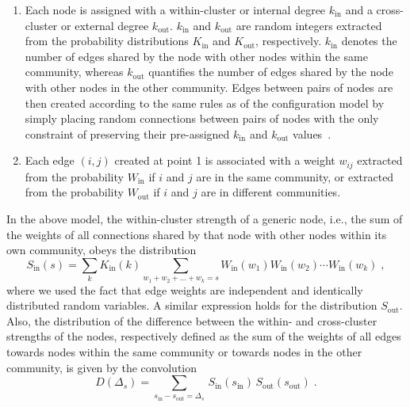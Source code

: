 \documentclass[a4paper,pre,superscriptaddress,floatfix,nofootinbib,twocolumn]{revtex4-1}
\begin{document}
\begin{enumerate}
    \item Each node is assigned with a within-cluster or internal degree $k_\text{in}$  and a cross-cluster or external degree $k_\text{out}$. $k_\text{in}$ and $k_\text{out}$ are random integers extracted from the probability distributions
    $K_\text{in}$ and $K_\text{out}$, respectively.
    $k_\text{in}$ denotes the number of edges shared by the node with other nodes within the same community, whereas $k_\text{out}$ quantifies the number of edges shared by the node with other nodes in the other community.
    Edges between pairs of nodes are then created according to the same rules as of the configuration model by simply placing random connections between pairs of nodes with the only constraint of preserving their pre-assigned $k_\text{in}$ and $k_\text{out}$ values~\cite{molloy1995critical}.

    \item Each edge $(i,j)$ created at point 1 is associated with a weight $w_{ij}$ extracted from the probability $W_\text{in}$ if $i$ and $j$ are in the same community, or extracted from the probability $W_\text{out}$ if $i$ and $j$ are in different communities.
\end{enumerate}

In the above model, the within-cluster strength of a generic node, i.e., the sum of the weights of all connections shared by that node with other nodes within its own community, obeys the distribution
\begin{equation}
    S_\text{in} (s) =
    \sum_{k}  K_\text{in}(k)  \sum_{w_1 + w_2 + \ldots + w_k = s}  W_\text{in}(w_1)  W_\text{in}(w_2) \cdots W_\text{in}(w_k) \; ,
    \label{eq:conv1}
\end{equation}
where we used the fact that edge weights are independent and identically distributed random variables. A similar expression holds for the distribution $S_\text{out}$.
Also, the distribution of the difference between the within- and cross-cluster strengths of the nodes, respectively defined as the sum of the weights of all edges towards nodes within the same community or towards nodes in the other community, is given by the convolution
\begin{equation}
D(\Delta_s) = \sum_{s_\text{in} - s_\text{out} = \Delta_s} \,  S_\text{in} (s_\text{in}) \, S_\text{out} (s_\text{out}) \; .
\label{eq:conv2}
\end{equation}
\end{document}
